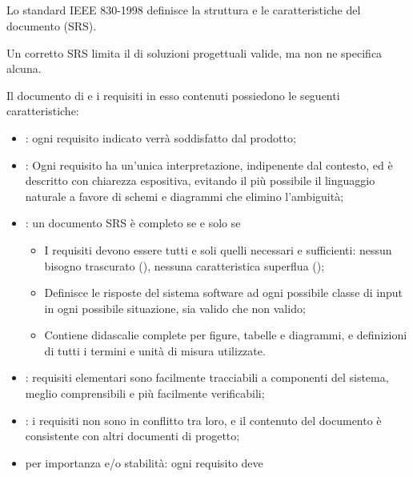\subsection{}

Lo standard IEEE 830-1998 definisce la struttura e le caratteristiche del
documento  (SRS).

Un corretto SRS limita il  di soluzioni progettuali valide,
ma non ne specifica alcuna.

Il documento di  e i requisiti in
esso contenuti possiedono le seguenti caratteristiche:

\begin{itemize}
  \item {}: ogni requisito indicato verrà soddisfatto dal
    prodotto;
  \item {}: Ogni requisito ha un'unica interpretazione,
  indipenente dal contesto, ed è descritto con chiarezza
    espositiva, evitando il più possibile il linguaggio naturale a favore di
    schemi e diagrammi che elimino l'ambiguità;
  \item {}: un documento SRS è completo se e solo se
    \begin{itemize}
      \item I requisiti devono essere tutti e soli quelli necessari e
        sufficienti: nessun bisogno trascurato (), nessuna
        caratteristica superflua ();
      \item Definisce le risposte del sistema software ad ogni possibile classe
        di input in ogni possibile situazione, sia valido che non valido;
      \item Contiene didascalie complete per figure, tabelle e diagrammi, e
        definizioni di tutti i termini e unità di misura utilizzate.
    \end{itemize}
  \item {}: requisiti elementari sono facilmente
    tracciabili a componenti del sistema, meglio comprensibili e più facilmente
    verificabili;
  \item {}: i requisiti non sono in conflitto tra loro, e il
  contenuto del documento è consistente con altri documenti di progetto;
  \item {} per importanza e/o stabilità: ogni requisito deve

\end{itemize}
